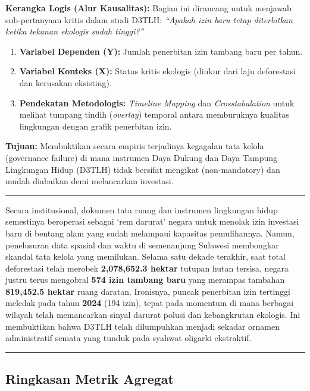 \documentclass[
]{article}
\providecommand{\tightlist}{%
  \setlength{\itemsep}{0pt}\setlength{\parskip}{0pt}}
\begin{document}
\textbf{Kerangka Logis (Alur Kausalitas):} Bagian ini dirancang untuk
menjawab sub-pertanyaan kritis dalam studi D3TLH: \emph{``Apakah izin
baru tetap diterbitkan ketika tekanan ekologis sudah tinggi?''}

\begin{enumerate}
\def\labelenumi{\arabic{enumi}.}
\tightlist
\item
  \textbf{Variabel Dependen (Y):} Jumlah penerbitan izin tambang baru
  per tahun.
\item
  \textbf{Variabel Konteks (X):} Status kritis ekologis (diukur dari
  laju deforestasi dan kerusakan eksisting).
\item
  \textbf{Pendekatan Metodologis:} \emph{Timeline Mapping} dan
  \emph{Crosstabulation} untuk melihat tumpang tindih (\emph{overlay})
  temporal antara memburuknya kualitas lingkungan dengan grafik
  penerbitan izin.
\end{enumerate}

\textbf{Tujuan:} Membuktikan secara empiris terjadinya kegagalan tata
kelola (governance failure) di mana instrumen Daya Dukung dan Daya
Tampung Lingkungan Hidup (D3TLH) tidak bersifat mengikat (non-mandatory)
dan mudah diabaikan demi melancarkan investasi.

\begin{center}\rule{0.5\linewidth}{0.5pt}\end{center}

Secara institusional, dokumen tata ruang dan instrumen lingkungan hidup
semestinya beroperasi sebagai `rem darurat' negara untuk menolak izin
investasi baru di bentang alam yang sudah melampaui kapasitas
pemulihannya. Namun, penelusuran data spasial dan waktu di semenanjung
Sulawesi membongkar skandal tata kelola yang memilukan. Selama satu
dekade terakhir, saat total deforestasi telah merobek
\textbf{2,078,652.3 hektar} tutupan hutan tersisa, negara justru terus
mengobral \textbf{574 izin tambang baru} yang merampas tambahan
\textbf{819,452.5 hektar} ruang daratan. Ironisnya, puncak penerbitan
izin tertinggi meledak pada tahun \textbf{2024} (194 izin), tepat pada
momentum di mana berbagai wilayah telah memancarkan sinyal darurat
polusi dan kebangkrutan ekologis. Ini membuktikan bahwa D3TLH telah
dilumpuhkan menjadi sekadar ornamen administratif semata yang tunduk
pada syahwat oligarki ekstraktif.

\begin{center}\rule{0.5\linewidth}{0.5pt}\end{center}

\subsection{Ringkasan Metrik Agregat}\label{ringkasan-metrik-agregat}
\end{document}
